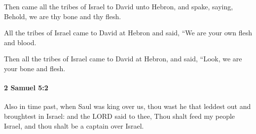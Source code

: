 			\begin{versebox}
					\item[BHS] 
					\item[ASV] Then came all the tribes of Israel to David unto Hebron, and spake, saying, Behold, we are thy bone and thy flesh.
					\item[NIV] All the tribes of Israel came to David at Hebron and said, “We are your own flesh and blood.
					\item[NRSV] Then all the tribes of Israel came to David at Hebron, and said, “Look, we are your bone and flesh.
			\end{versebox}

		\paragraph{2 Samuel 5:2} %
			\label{2SAMUEL-5-2}

			Also in time past, when Saul was king over us, thou wast he that leddest out and broughtest in Israel: and the LORD said to thee, Thou shalt feed my people Israel, and thou shalt be a captain over Israel.

